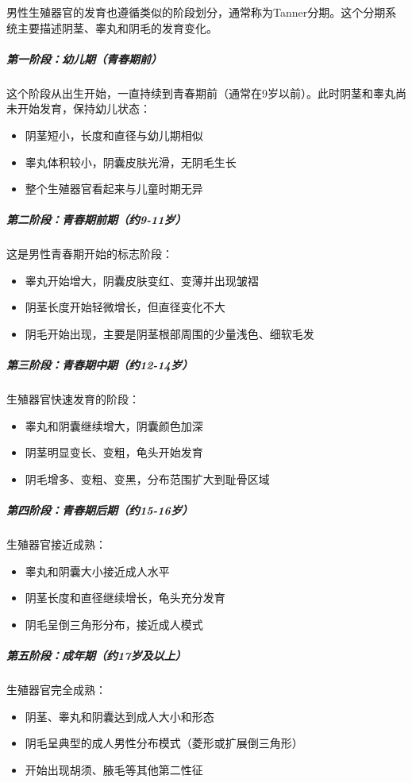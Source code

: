 \documentclass[12pt,a4paper,twoside]{ctexbook}
\begin{document}
男性生殖器官的发育也遵循类似的阶段划分，通常称为Tanner分期。这个分期系统主要描述阴茎、睾丸和阴毛的发育变化。

\subparagraph{第一阶段：幼儿期（青春期前）}

这个阶段从出生开始，一直持续到青春期前（通常在9岁以前）。此时阴茎和睾丸尚未开始发育，保持幼儿状态：
\begin{itemize}
    \item 阴茎短小，长度和直径与幼儿期相似
    \item 睾丸体积较小，阴囊皮肤光滑，无阴毛生长
    \item 整个生殖器官看起来与儿童时期无异
\end{itemize}

\subparagraph{第二阶段：青春期前期（约9-11岁）}

这是男性青春期开始的标志阶段：
\begin{itemize}
    \item 睾丸开始增大，阴囊皮肤变红、变薄并出现皱褶
    \item 阴茎长度开始轻微增长，但直径变化不大
    \item 阴毛开始出现，主要是阴茎根部周围的少量浅色、细软毛发
\end{itemize}

\subparagraph{第三阶段：青春期中期（约12-14岁）}

生殖器官快速发育的阶段：
\begin{itemize}
    \item 睾丸和阴囊继续增大，阴囊颜色加深
    \item 阴茎明显变长、变粗，龟头开始发育
    \item 阴毛增多、变粗、变黑，分布范围扩大到耻骨区域
\end{itemize}

\subparagraph{第四阶段：青春期后期（约15-16岁）}

生殖器官接近成熟：
\begin{itemize}
    \item 睾丸和阴囊大小接近成人水平
    \item 阴茎长度和直径继续增长，龟头充分发育
    \item 阴毛呈倒三角形分布，接近成人模式
\end{itemize}

\subparagraph{第五阶段：成年期（约17岁及以上）}

生殖器官完全成熟：
\begin{itemize}
    \item 阴茎、睾丸和阴囊达到成人大小和形态
    \item 阴毛呈典型的成人男性分布模式（菱形或扩展倒三角形）
    \item 开始出现胡须、腋毛等其他第二性征
\end{itemize}
\end{document}
